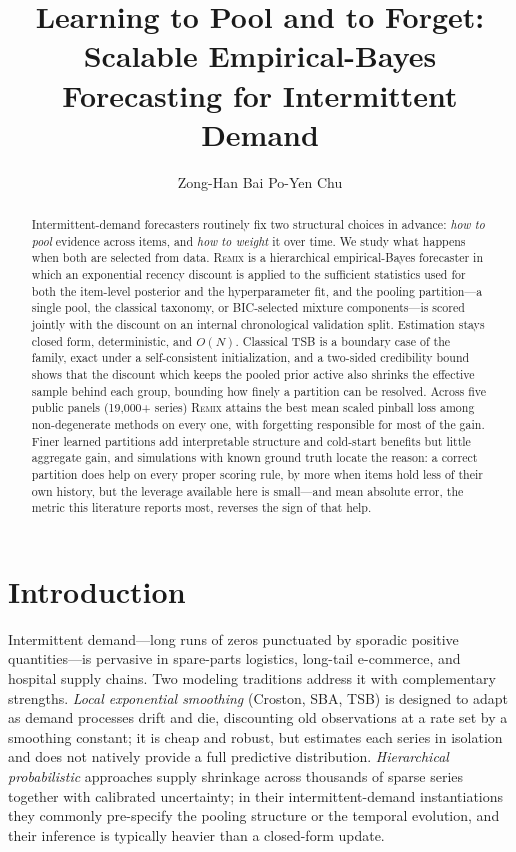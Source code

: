 \documentclass[twocolumn,10pt]{article}
\title{Learning to Pool and to Forget:\\
Scalable Empirical-Bayes Forecasting for Intermittent Demand}
\author{Zong-Han Bai \qquad Po-Yen Chu}
\date{}
\newcommand{\REMIX}{\textsc{Remix}}
\begin{document}
\maketitle

\begin{abstract}
Intermittent-demand forecasters routinely fix two structural choices in
advance: \emph{how to pool} evidence across items, and \emph{how to
weight} it over time. We study what happens when both are selected from
data. \REMIX{} is a hierarchical empirical-Bayes forecaster in which an
exponential recency discount is applied to the sufficient statistics used
for both the item-level posterior and the hyperparameter fit, and the
pooling partition---a single pool, the classical taxonomy, or
BIC-selected mixture components---is scored jointly with the discount on
an internal chronological validation split. Estimation stays closed form,
deterministic, and $O(N)$. Classical TSB is a boundary case of the
family, exact under a self-consistent initialization, and a two-sided
credibility bound shows that the discount which keeps the pooled prior
active also shrinks the effective sample behind each group, bounding how
finely a partition can be resolved. Across five public panels (19{,}000+ series) \REMIX{}
attains the best mean scaled pinball loss among non-degenerate methods on
every one, with forgetting responsible for most of the gain.
Finer learned partitions add interpretable structure and cold-start
benefits but little aggregate gain, and simulations with known ground
truth locate the reason: a correct partition does help on every proper
scoring rule, by more when items hold less of their own history, but the
leverage available here is small---and mean absolute error, the metric
this literature reports most, reverses the sign of that help.
\end{abstract}

\section{Introduction}\label{sec:intro}

Intermittent demand---long runs of zeros punctuated by sporadic positive
quantities---is pervasive in spare-parts logistics, long-tail e-commerce,
and hospital supply chains. Two modeling traditions address it with
complementary strengths. \emph{Local exponential smoothing} (Croston,
SBA, TSB) \citep{croston1972,syntetos2005accuracy,teunter2011} is
designed to adapt as demand processes drift and die, discounting old
observations at a rate set by a smoothing constant; it is cheap and
robust, but estimates each series in isolation and does not natively
provide a full predictive distribution. \emph{Hierarchical probabilistic}
approaches \citep{chapados2014,seeger2016,pitkin2024} supply shrinkage
across thousands of sparse series together with calibrated uncertainty;
in their intermittent-demand instantiations they commonly pre-specify the
pooling structure or the temporal evolution, and their inference is
typically heavier than a closed-form update.
\end{document}
